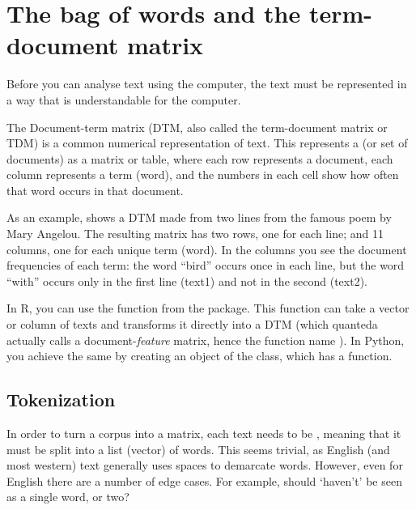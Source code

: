 \section{The bag of words and the term-document matrix}
\label{sec:dtm}

Before you can analyse text using the computer, the text must be represented in a way that is understandable for the computer.

The Document-term matrix (DTM, also called the term-document matrix or TDM) is a common numerical representation of text.
This represents a  (or set of documents) as a matrix or table, where each row represents a document, each column represents a term (word),
and the numbers in each cell show how often that word occurs in that document.


As an example,  shows a DTM made from two lines from the famous poem by Mary Angelou.
The resulting matrix has two rows, one for each line; and 11 columns, one for each unique term (word).
In the columns you see the document frequencies of each term: the word ``bird'' occurs once in each line,
but the word ``with'' occurs only in the first line (text1) and not in the second (text2).

In R, you can use the  function from the  package.
This function can take a vector or column of texts and transforms it directly into a DTM
(which quanteda actually calls a document-\emph{feature} matrix, hence the function name ).
In Python, you achieve the same by creating an object of the  class, which has a  function.


\subsection{Tokenization}

In order to turn a corpus into a matrix, each text needs to be ,
meaning that it must be split into a list (vector) of words.
This seems trivial, as English (and most western) text generally uses spaces to demarcate words.
However, even for English there are a number of edge cases. 
For example, should `haven't' be seen as a single word, or two?


